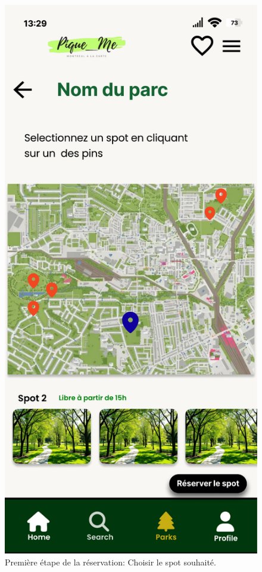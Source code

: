 \documentclass[12pt,a4paper]{article}
\begin{document}
\begin{figure}[h!]
  \centering
  \includegraphics[width=0.9\linewidth]{attachments/reserverSpot1.pdf}
  \caption{Première étape de la réservation: Choisir le spot souhaité.}
\end{figure}
\end{document}
